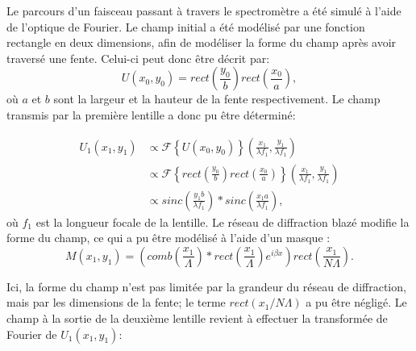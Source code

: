 \documentclass[conference]{IEEEtran}
\begin{document}
Le parcours d'un faisceau passant à travers le spectromètre a été simulé à l'aide 
de l'optique de Fourier. Le champ initial a été modélisé par une fonction rectangle en deux dimensions,
afin de modéliser la forme du champ après avoir traversé une fente. Celui-ci peut donc être décrit par:
\[U(x_0,y_0)=rect(\frac{y_0}{b})rect(\frac{x_0}{a}),\]
où $a$ et $b$ sont la largeur et la hauteur de la fente respectivement. Le champ transmis par 
la première lentille a donc pu être déterminé:

\begin{align*}
    U_1(x_1,y_1)&\propto\mathscr{F}\left\{U(x_0,y_0)\right\}(\frac{x_1}{\lambda f_1},\frac{y_1}{\lambda f_1})\\
    &\propto \mathscr{F}\left\{rect(\frac{y_0}{b})rect(\frac{x_0}{a})\right\}(\frac{x_1}{\lambda f_1},\frac{y_1}{\lambda f_1})\\
    &\propto sinc(\frac{y_1b}{\lambda f_1})\ast sinc(\frac{x_1a}{\lambda f_1}),
\end{align*}
où $f_1$ est la longueur focale de la lentille. Le réseau de diffraction blazé modifie la forme du champ, ce qui a pu être
modélisé à l'aide d'un masque \cite{procedurier}:
\[M(x_1,y_1)=(comb(\frac{x_1}{\Lambda})\ast rect(\frac{x_1}{\Lambda})e^{i\beta x})rect(\frac{x_1}{N\Lambda}).\]

Ici, la forme du champ n'est pas limitée par la grandeur du réseau de diffraction, mais par les dimensions
de la fente; le terme $rect(x_1/N\Lambda)$ a pu être négligé. Le champ à la sortie de la deuxième lentille revient à effectuer la transformée de Fourier
de $U_1(x_1,y_1)$:
\end{document}
